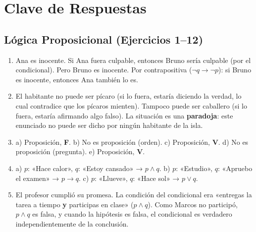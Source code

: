 \documentclass[12pt, letterpaper]{article}
\begin{document}
\newpage

\ifmwclaves
  \section{Clave de Respuestas}

  \subsection*{Lógica Proposicional (Ejercicios 1--12)}

  \begin{enumerate}[leftmargin=*, label=\textbf{\arabic*.}]
    \item Ana es inocente. Si Ana fuera culpable, entonces Bruno sería culpable (por el condicional). Pero Bruno es inocente. Por contrapositiva ($\neg q \rightarrow \neg p$): si Bruno es inocente, entonces Ana también lo es.

    \item El habitante no puede ser pícaro (si lo fuera, estaría diciendo la verdad, lo cual contradice que los pícaros mienten). Tampoco puede ser caballero (si lo fuera, estaría afirmando algo falso). La situación es una \textbf{paradoja}: este enunciado no puede ser dicho por ningún habitante de la isla.

    \item a) Proposición, \textbf{F}. \quad b) No es proposición (orden). \quad c) Proposición, \textbf{V}. \quad d) No es proposición (pregunta). \quad e) Proposición, \textbf{V}.

    \item a) $p$: «Hace calor», $q$: «Estoy cansado» → $p \wedge q$. \quad b) $p$: «Estudio», $q$: «Apruebo el examen» → $p \rightarrow q$. \quad c) $p$: «Llueve», $q$: «Hace sol» → $p \vee q$.

    \item El profesor cumplió su promesa. La condición del condicional era «entregas la tarea a tiempo \textbf{y} participas en clase» ($p \wedge q$). Como Marcos no participó, $p \wedge q$ es falsa, y cuando la hipótesis es falsa, el condicional es verdadero independientemente de la conclusión.


\end{enumerate}
\end{document}
